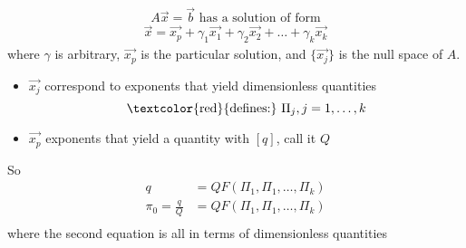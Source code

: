 \documentclass[
	date={August 26{,} 2024}
]{math486notes}
\begin{document}
\[ A\vec{x} = \vec{b} \mbox{ has a solution of form}\]
\begin{equation*}
\begin{aligned}
	\vec{x} = \vec{x_{p}} + \gamma_{1}\vec{x_{1}} + \gamma_{2}\vec{x_{2}} + \dots + \gamma_{k}\vec{x_{k}} %
\end{aligned}
\end{equation*}
where $\gamma$ is arbitrary, $\vec{x_{p}}$ is the particular solution, and $\{ \vec{x_{j}} \}$ is the null space of $A$.
\begin{itemize}
	\item $\vec{x_{j}}$ correspond to exponents that yield dimensionless quantities
	\[ \mbox{\textcolor{red}{defines:} } \Pi_{j}, j=1,\dots,k \]
	\item $\vec{x_{p}}$ exponents that yield a quantity with $[q]$, call it $Q$
\end{itemize}
So
\begin{equation*}
\begin{aligned}
	q &= QF(\Pi_{1}, \Pi_{1}, \dots, \Pi_{k})\\
	\pi_{0} = \frac{q}{Q} &= QF(\Pi_{1}, \Pi_{1}, \dots, \Pi_{k})\\
\end{aligned}
\end{equation*}
where the second equation is all in terms of dimensionless quantities
\end{document}
